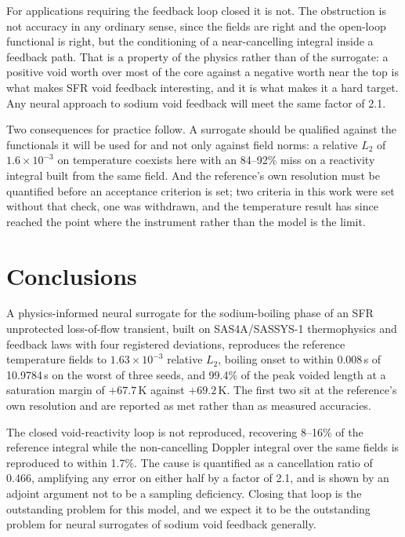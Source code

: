 \documentclass[11pt,a4paper]{article}
\begin{document}
For applications requiring the feedback loop closed it is not. The obstruction is not
accuracy in any ordinary sense, since the fields are right and the open-loop functional is
right, but the conditioning of a near-cancelling integral inside a feedback path. That is a
property of the physics rather than of the surrogate: a positive void worth over most of
the core against a negative worth near the top is what makes SFR void feedback interesting,
and it is what makes it a hard target. Any neural approach to sodium void feedback will meet
the same factor of 2.1.

Two consequences for practice follow. A surrogate should be qualified against the
functionals it will be used for and not only against field norms: a relative $L_2$ of
$1.6\times10^{-3}$ on temperature coexists here with an 84--92\% miss on a reactivity
integral built from the same field. And the reference's own resolution must be quantified
before an acceptance criterion is set; two criteria in this work were set without that
check, one was withdrawn, and the temperature result has since reached the point where the
instrument rather than the model is the limit.

\section{Conclusions}

A physics-informed neural surrogate for the sodium-boiling phase of an SFR unprotected
loss-of-flow transient, built on SAS4A/SASSYS-1 thermophysics and feedback laws with four
registered deviations, reproduces the reference temperature fields to $1.63\times10^{-3}$
relative $L_2$, boiling onset to within 0.008\,s of 10.9784\,s on the worst of three seeds,
and 99.4\% of the peak voided length at a saturation margin of $+67.7$\,K against
$+69.2$\,K. The first two sit at the reference's own resolution and are reported as met
rather than as measured accuracies.

The closed void-reactivity loop is not reproduced, recovering 8--16\% of the reference
integral while the non-cancelling Doppler integral over the same fields is reproduced to
within 1.7\%.
The cause is quantified as a cancellation ratio of 0.466, amplifying any error on either
half by a factor of 2.1, and is shown by an adjoint argument not to be a sampling
deficiency. Closing that loop is the outstanding problem for this model, and we expect it to
be the outstanding problem for neural surrogates of sodium void feedback generally.
\end{document}

